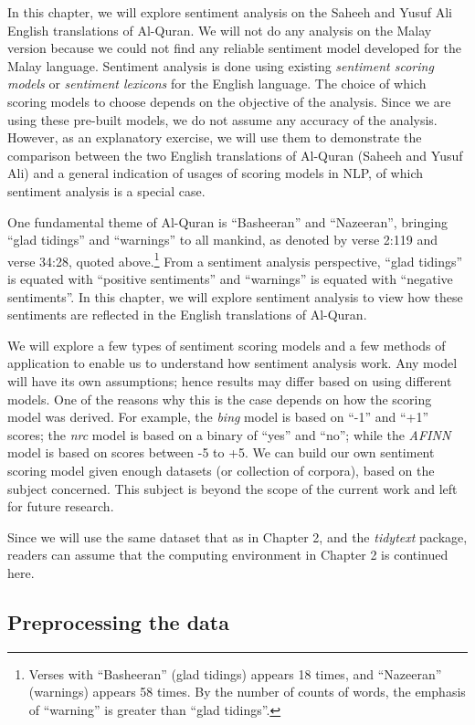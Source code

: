 \documentclass[
]{article}
\begin{document}
In this chapter, we will explore sentiment analysis on the Saheeh and Yusuf Ali English translations of Al-Quran. We will not do any analysis on the Malay version because we could not find any reliable sentiment model developed for the Malay language. Sentiment analysis is done using existing \emph{sentiment scoring models} or \emph{sentiment lexicons} for the English language. The choice of which scoring models to choose depends on the objective of the analysis. Since we are using these pre-built models, we do not assume any accuracy of the analysis. However, as an explanatory exercise, we will use them to demonstrate the comparison between the two English translations of Al-Quran (Saheeh and Yusuf Ali) and a general indication of usages of scoring models in NLP, of which sentiment analysis is a special case.

One fundamental theme of Al-Quran is ``Basheeran'' and ``Nazeeran'', bringing ``glad tidings'' and ``warnings'' to all mankind, as denoted by verse 2:119 and verse 34:28, quoted above.\footnote{Verses with ``Basheeran'' (glad tidings) appears 18 times, and ``Nazeeran'' (warnings) appears 58 times. By the number of counts of words, the emphasis of ``warning'' is greater than ``glad tidings''.} From a sentiment analysis perspective, ``glad tidings'' is equated with ``positive sentiments'' and ``warnings'' is equated with ``negative sentiments''. In this chapter, we will explore sentiment analysis to view how these sentiments are reflected in the English translations of Al-Quran.

We will explore a few types of sentiment scoring models and a few methods of application to enable us to understand how sentiment analysis work. Any model will have its own assumptions; hence results may differ based on using different models. One of the reasons why this is the case depends on how the scoring model was derived. For example, the \emph{bing} model is based on ``-1'' and ``+1'' scores; the \emph{nrc} model is based on a binary of ``yes'' and ``no''; while the \emph{AFINN} model is based on scores between -5 to +5. We can build our own sentiment scoring model given enough datasets (or collection of corpora), based on the subject concerned. This subject is beyond the scope of the current work and left for future research.

Since we will use the same dataset that as in Chapter 2, and the \emph{tidytext} package, readers can assume that the computing environment in Chapter 2 is continued here.

\hypertarget{preprocessing-the-data}{%
\subsection{Preprocessing the data}\label{preprocessing-the-data}}
\end{document}
